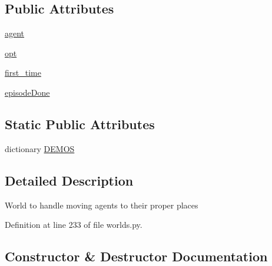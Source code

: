 \subsection*{Public Attributes}
\begin{DoxyCompactItemize}
\item 
\hyperlink{classparlai_1_1messenger_1_1tasks_1_1overworld__demo_1_1worlds_1_1MessengerOverworld_ad8f31cb268f8cabc723bdacd443181d7}{agent}
\item 
\hyperlink{classparlai_1_1messenger_1_1tasks_1_1overworld__demo_1_1worlds_1_1MessengerOverworld_aaff57f24d0e72c7400f6edd1aa374875}{opt}
\item 
\hyperlink{classparlai_1_1messenger_1_1tasks_1_1overworld__demo_1_1worlds_1_1MessengerOverworld_acb7af295e8d25f31e3c97a9a23856cdf}{first\+\_\+time}
\item 
\hyperlink{classparlai_1_1messenger_1_1tasks_1_1overworld__demo_1_1worlds_1_1MessengerOverworld_a567785bd1e28e3460df047a1759fd0ea}{episode\+Done}
\end{DoxyCompactItemize}
\subsection*{Static Public Attributes}
\begin{DoxyCompactItemize}
\item 
dictionary \hyperlink{classparlai_1_1messenger_1_1tasks_1_1overworld__demo_1_1worlds_1_1MessengerOverworld_a03ff4783f21f554dfba79dc51adbc92e}{D\+E\+M\+OS}
\end{DoxyCompactItemize}


\subsection{Detailed Description}
\begin{DoxyVerb}World to handle moving agents to their proper places\end{DoxyVerb}
 

Definition at line 233 of file worlds.\+py.



\subsection{Constructor \& Destructor Documentation}
\mbox{\label{classparlai_1_1messenger_1_1tasks_1_1overworld__demo_1_1worlds_1_1MessengerOverworld_af3a636d5583b23686d2de7b010481956}} 
